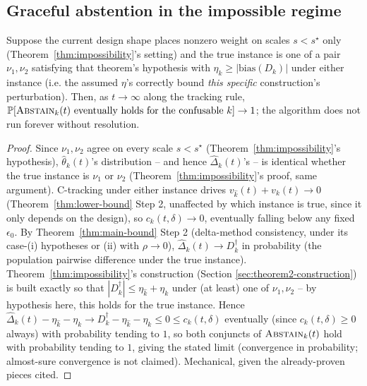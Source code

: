 \subsection{Graceful abstention in the impossible regime}
\label{sec:theorem4-abstention}

\begin{theorem}
\label{thm:abstention}
Suppose the current design shape places nonzero weight on scales
$s < s^\star$ only (Theorem~\ref{thm:impossibility}'s setting) and the true instance
is one of a pair $\nu_1, \nu_2$ satisfying that theorem's hypothesis with
$\eta_k \ge |\mathrm{bias}(D_k)|$ under either instance (i.e. the assumed $\eta$'s
correctly bound \emph{this specific} construction's perturbation). Then, as $t \to
\infty$ along the tracking rule, $\mathbb{P}[\textsc{Abstain}_k(t) \text{ eventually
holds for the confusable } k] \to 1$; the algorithm does not run forever without
resolution.
\end{theorem}

\begin{proof}
Since $\nu_1,\nu_2$ agree on every scale $s<s^\star$ (Theorem~\ref{thm:impossibility}'s
hypothesis), $\hat\theta_{k}(t)$'s distribution -- and hence
$\widehat\Delta_k(t)$'s -- is identical whether the true instance is $\nu_1$ or $\nu_2$
(Theorem~\ref{thm:impossibility}'s proof, same argument). C-tracking under either
instance drives $v_{\hat{k}}(t) + v_k(t) \to 0$ (Theorem~\ref{thm:lower-bound} Step 2,
unaffected by which instance is true, since it only depends on the design), so
$c_k(t,\delta) \to 0$, eventually falling below any fixed $\epsilon_0$.
By Theorem~\ref{thm:main-bound} Step 2 (delta-method consistency, under its case-(i)
hypotheses or (ii) with $\rho \to 0$),
$\widehat\Delta_k(t) \to D_k^\dagger$ in probability (the population pairwise difference under
the true instance). Theorem~\ref{thm:impossibility}'s construction (Section
\ref{sec:theorem2-construction}) is built exactly so that
$|D_k^\dagger| \le \eta_{\hat{k}}+\eta_k$ under (at least) one of $\nu_1,\nu_2$ -- by
hypothesis here, this holds for the true instance. Hence $\widehat\Delta_k(t) -
\eta_{\hat{k}}-\eta_k \to D_k^\dagger - \eta_{\hat{k}}-\eta_k \le 0 \le c_k(t,\delta)$
eventually (since $c_k(t,\delta) \ge 0$ always) with probability tending to $1$, so both
conjuncts of $\textsc{Abstain}_k(t)$ hold with probability tending to $1$, giving the stated
limit (convergence in probability; almost-sure convergence is not claimed). Mechanical,
given the already-proven pieces cited.
\end{proof}

